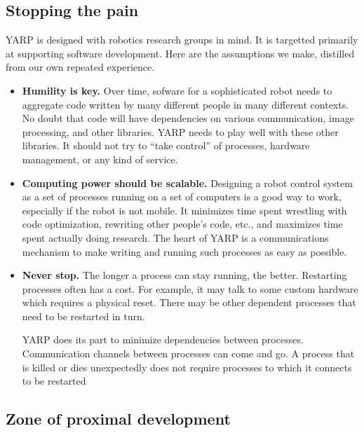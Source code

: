 
\subsection*{Stopping the pain}

YARP is designed with robotics research groups in mind.  
%
%
It is targetted primarily at supporting software development.
%
%
Here are the assumptions we make, distilled from our own repeated
experience.  
%

\begin{itemize}

\item {\bf Humility is key.}
%
Over time, sofware for a sophisticated robot needs to 
aggregate code written by many different people in many
different contexts.  No doubt that code will have
dependencies on various communication, image processing,
and other libraries.
%
YARP needs to play well with these other libraries.
It should not try to ``take control'' of processes,
hardware management, or any kind of service.


\item {\bf Computing power should be scalable.}
%
Designing a robot control system as a set of processes running on
  a set of computers is a good way to work, especially if the robot
  is not mobile.  It minimizes time spent wrestling with code
  optimization, rewriting other people's code, etc., and maximizes
  time spent actually doing research.
  The heart of YARP is a communications mechanism to make writing
  and running such processes as easy as possible.


\item {\bf Never stop.}
%
The longer a process can stay running, the better.  Restarting
  processes often has a cost.  For example, it may talk to some
  custom hardware which requires a physical reset.  There may
  be other dependent processes that need to be restarted in turn.

  YARP does its part to minimize dependencies between processes.
  Communication channels between processes can come and go.
  A process that is killed or dies unexpectedly does not
  require processes to which it connects to be restarted



\end{itemize}


\subsection*{Zone of proximal development}

